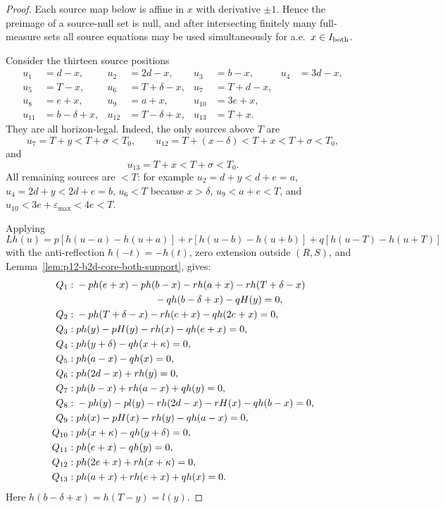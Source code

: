\begin{proof}
Each source map below is affine in \(x\) with derivative \(\pm1\).
Hence the preimage of a source-null set is null, and after intersecting
finitely many full-measure sets all source equations may be used
simultaneously for a.e.\ \(x\in I_{\rm both}\).

Consider the thirteen source positions
\[
\begin{aligned}
u_1&=d-x, &
u_2&=2d-x, &
u_3&=b-x, &
u_4&=3d-x,\\
u_5&=T-x, &
u_6&=T+\delta-x, &
u_7&=T+d-x,\\
u_8&=e+x, &
u_9&=a+x, &
u_{10}&=3e+x,\\
u_{11}&=b-\delta+x, &
u_{12}&=T-\delta+x, &
u_{13}&=T+x.
\end{aligned}
\]
They are all horizon-legal.  Indeed, the only sources above \(T\) are
\[
u_7=T+y<T+\sigma<T_0,\qquad
u_{12}=T+(x-\delta)<T+x<T+\sigma<T_0,
\]
and
\[
u_{13}=T+x<T+\sigma<T_0.
\]
All remaining sources are \(<T\): for example
\(u_2=d+y<d+e=a\),
\(u_4=2d+y<2d+e=b\),
\(u_6<T\) because \(x>\delta\),
\(u_9<a+e<T\), and
\(u_{10}<3e+\varepsilon_{\max}<4e<T\).

Applying
\[
Lh(u)=p[h(u-a)-h(u+a)]
+r[h(u-b)-h(u+b)]
+q[h(u-T)-h(u+T)]
\]
with the anti-reflection \(h(-t)=-h(t)\), zero extension outside
\((R,S)\), and Lemma~\ref{lem:p12-b2d-core-both-support}, gives:
\begin{align*}
Q_1:\;&-p h(e+x)-p h(b-x)-r h(a+x)-r h(T+\delta-x)\\
&\hspace{28mm}-q h(b-\delta+x)-q H(y)=0,\\
Q_2:\;&-p h(T+\delta-x)-r h(e+x)-q h(2e+x)=0,\\
Q_3:\;&p h(y)-pH(y)-r h(x)-q h(e+x)=0,\\
Q_4:\;&p h(y+\delta)-q h(x+\kappa)=0,\\
Q_5:\;&p h(a-x)-q h(x)=0,\\
Q_6:\;&p h(2d-x)+r h(y)=0,\\
Q_7:\;&p h(b-x)+r h(a-x)+q h(y)=0,\\
Q_8:\;&-p h(y)-p l(y)-r h(2d-x)-rH(x)-q h(b-x)=0,\\
Q_9:\;&p h(x)-pH(x)-r h(y)-q h(a-x)=0,\\
Q_{10}:\;&p h(x+\kappa)-q h(y+\delta)=0,\\
Q_{11}:\;&p h(e+x)-q h(y)=0,\\
Q_{12}:\;&p h(2e+x)+r h(x+\kappa)=0,\\
Q_{13}:\;&p h(a+x)+r h(e+x)+q h(x)=0.
\end{align*}
Here \(h(b-\delta+x)=h(T-y)=l(y)\).


\end{proof}
